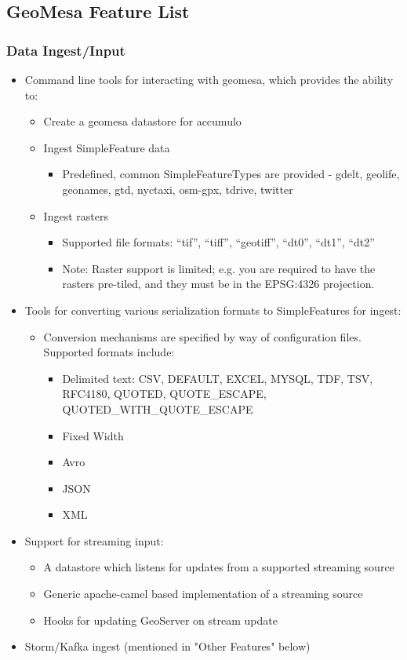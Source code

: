 \subsection{GeoMesa Feature List}
\label{appendix:features:geomesa}

\subsubsection*{Data Ingest/Input}

\begin{itemize}
\item{Command line tools for interacting with geomesa, which provides the ability to:
  \begin{itemize}
  \item Create a geomesa datastore for accumulo
  \item{Ingest SimpleFeature data
    \begin{itemize}
    \item Predefined, common SimpleFeatureTypes are provided - gdelt, geolife, geonames, gtd, nyctaxi, osm-gpx, tdrive, twitter
    \end{itemize}
  }
  \item{Ingest rasters
    \begin{itemize}
    \item Supported file formats: ``tif'', ``tiff'', ``geotiff'', ``dt0'', ``dt1'', ``dt2''
    \item Note: Raster support is limited; e.g. you are required to have the rasters pre-tiled, and they must be in the EPSG:4326 projection.
    \end{itemize}
  }
  \end{itemize}
}
\item{Tools for converting various serialization formats to SimpleFeatures for ingest:
  \begin{itemize}
  \item{Conversion mechanisms are specified by way of configuration files.  Supported formats include:
    \begin{itemize}
    \item Delimited text: CSV, DEFAULT, EXCEL, MYSQL, TDF, TSV, RFC4180, QUOTED, QUOTE\_ESCAPE, QUOTED\_WITH\_QUOTE\_ESCAPE
    \item Fixed Width
    \item Avro
    \item JSON
    \item XML
    \end{itemize}
  }
  \end{itemize}
}
\item{Support for streaming input:
  \begin{itemize}
  \item A datastore which listens for updates from a supported streaming source
  \item Generic apache-camel based implementation of a streaming source
  \item Hooks for updating GeoServer on stream update
  \end{itemize}
}
\item Storm/Kafka ingest (mentioned in "Other Features" below)
\end{itemize}


